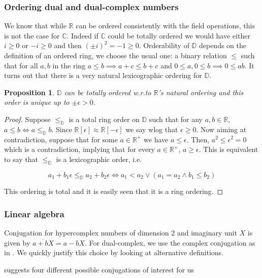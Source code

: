 \documentclass{article}
\newtheorem{proposition}[theorem]{Proposition}
\newcommand{\R}{\mathbb{R}}
\newcommand{\C}{\mathbb{C}}
\newcommand{\D}{\mathbb{D}}
\newcommand{\e}{\epsilon}
\renewcommand{\bar}{\overline}
\begin{document}
\subsubsection*{Ordering dual and dual-complex numbers}

We know that while $\R$ can be ordered consistently with the field operations, this is not the case for $\C$. Indeed if $\C$ could be totally ordered we would have either $i \geq 0$ or $-i \geq 0$ and then $(\pm i)^2 = -1 \geq 0$. Orderability of $\D$ depends on the definition of an ordered ring, we choose the usual one: a binary relation $\leq$ such that for all $a, b$ in the ring $a \leq b \implies a + c \leq b + c$ and $0 \leq a, 0 \leq b \implies 0 \leq ab$. \cite{fuchs1963} It turns out that there is a very natural lexicographic ordering for $\D$.

\begin{proposition}
 $\D$ can be totally ordered w.r.\@ to $\R$'s natural ordering and this order is unique up to $\pm \e > 0$.
\end{proposition}
\begin{proof}
Suppose $\leq_\D$ is a total ring order on $\D$ such that for any $a, b \in \R$, $a \leq b \iff a \leq_\D b$. Since $\R[\e] \approx \R[-\e]$ we say wlog that $\e \geq 0$. Now aiming at contradiction, suppose that for some $a \in \R^+$ we have $a \leq \e$. Then, $a^2 \leq \e^2 = 0$ which is a contradiction, implying that for every $a \in \R^+$, $a \geq \e$. This is equivalent to say that $\leq_\D$ is a lexicographic order, i.e.\

\begin{equation}
a_1 + b_1 \e \leq_\D a_2 + b_2 \e \iff a_1 < a_2 \lor (a_1 = a_2 \land b_1 \leq b_2)
\end{equation}

This ordering is total and it is easily seen that it is a ring ordering.
\end{proof}

\subsubsection*{Linear algebra}

\noindent Conjugation for hypercomplex numbers of dimension 2 and imaginary unit $X$ is given by $\bar{a + bX} = a - bX$. For dual-complex, we use the complex conjugation as in \cite{qi2023}. We quickly justify this choice by looking at alternative definitions.

\cite{messelmi2015} suggests four different possible conjugations of interest for us
\end{document}
